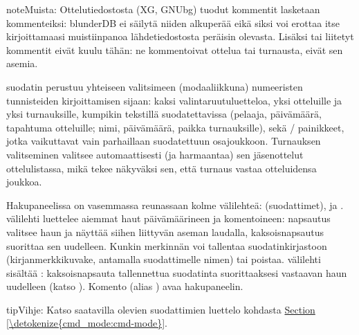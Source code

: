\documentclass[letterpaper,10pt,finnish]{sphinxmanual}
\begin{document}
\begin{sphinxadmonition}{note}{Muista:}
\sphinxAtStartPar
Ottelutiedostosta (XG, GNUbg) tuodut kommentit lasketaan kommenteiksi: blunderDB ei säilytä niiden alkuperää eikä siksi voi erottaa itse kirjoittamaasi muistiinpanoa lähdetiedostosta peräisin olevasta. Lisäksi  tai  liitetyt kommentit eivät kuulu tähän: ne kommentoivat ottelua tai turnausta, eivät sen asemia.
\end{sphinxadmonition}

\sphinxAtStartPar
{} \sphinxhyphen{}suodatin perustuu yhteiseen valitsimeen (modaali\sphinxhyphen{}ikkuna) numeeristen tunnisteiden kirjoittamisen sijaan: kaksi valintaruutuluetteloa, yksi otteluille ja yksi turnauksille, kumpikin tekstillä suodatettavissa (pelaaja, päivämäärä, tapahtuma otteluille; nimi, päivämäärä, paikka turnauksille), sekä  /  \sphinxhyphen{}painikkeet, jotka vaikuttavat vain parhaillaan suodatettuun osajoukkoon. Turnauksen valitseminen valitsee automaattisesti (ja harmaantaa) sen jäsenottelut ottelulistassa, mikä tekee näkyväksi sen, että turnaus vastaa otteluidensa joukkoa.

\sphinxAtStartPar
Hakupaneelissa on vasemmassa reunassaan kolme välilehteä:  (suodattimet),  ja . \sphinxhyphen{}välilehti luettelee aiemmat haut päivämäärineen ja komentoineen: napsautus valitsee haun ja näyttää siihen liittyvän aseman laudalla, kaksoisnapsautus suorittaa sen uudelleen. Kunkin merkinnän voi tallentaa suodatinkirjastoon (kirjanmerkkikuvake, antamalla suodattimelle nimen) tai poistaa. \sphinxhyphen{}välilehti sisältää : kaksoisnapsauta tallennettua suodatinta suorittaaksesi vastaavan haun uudelleen (katso {\hyperref[\detokenize{annexe_filtres:annexe-filtres}]{}}). Komento  (alias ) avaa hakupaneelin.

\begin{sphinxadmonition}{tip}{Vihje:}
\sphinxAtStartPar
Katso saatavilla olevien suodattimien luettelo kohdasta \hyperref[\detokenize{cmd_mode:cmd-mode}]{Section \ref{\detokenize{cmd_mode:cmd-mode}}}.
\end{sphinxadmonition}
\end{document}
